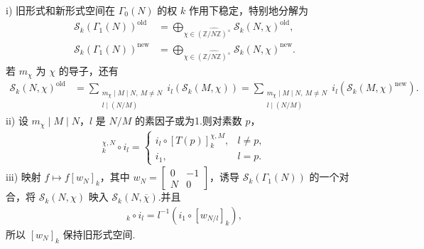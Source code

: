 \begin{lemma*}

i) 旧形式和新形式空间在 $\Gamma_0(N)$ 的权 $k$ 作用下稳定，特别地分解为
\begin{align*}
\mathcal S_k(\Gamma_1(N))^{\mathrm{old}}&=\bigoplus_{\chi\in\widehat{(\mathbb Z/N\mathbb Z)^\times}}\mathcal S_k(N,\chi)^{\mathrm{old}},\\
\mathcal S_k(\Gamma_1(N))^{\mathrm{new}}&=\bigoplus_{\chi\in\widehat{(\mathbb Z/N\mathbb Z)^\times}}\mathcal S_k(N,\chi)^{\mathrm{new}}.
\end{align*}
若 $m_\chi$ 为 $\chi$ 的导子，还有
\begin{align*}
\mathcal S_k(N,\chi)^{\mathrm{old}}&=\sum_{\substack{m_\chi\mid M\mid N,\ M\ne N\\l\mid(N/M)}}i_l(\mathcal S_k(M,\chi))
=\sum_{\substack{m_\chi\mid M\mid N,\ M\ne N\\l\mid(N/M)}}i_l(\mathcal S_k(M,\chi)^{\mathrm{new}}).
\end{align*}
ii) 设 $m_\chi\mid M\mid N$，$l$ 是 $N/M$ 的素因子或为1.则对素数 $p$，
\begin{align*}
[T(p)]_k^{\chi,N}\circ i_l=\begin{cases}i_l\circ[T(p)]_k^{\chi,M},&l\ne p,\\i_1,&l=p.\end{cases}
\end{align*}
iii) 映射 $f\mapsto f[w_N]_k$，其中 $w_N=\left[\begin{smallmatrix}0&-1\\N&0\end{smallmatrix}\right]$，诱导 $\mathcal S_k(\Gamma_1(N))$ 的一个对合，将 $\mathcal S_k(N,\chi)$ 映入 $\mathcal S_k(N,\overline\chi)$.并且
\begin{align*}
[w_N]_k\circ i_l=l^{-1}(i_1\circ[w_{N/l}]_k),
\end{align*}
所以 $[w_N]_k$ 保持旧形式空间.

\end{lemma*}


